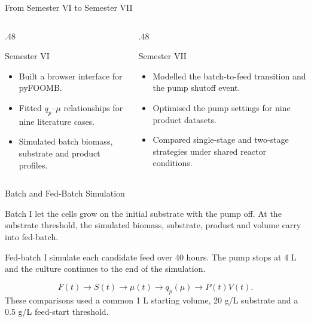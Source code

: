\documentclass[aspectratio=169, 11pt]{beamer}
\begin{document}
\begin{frame}{From Semester VI to Semester VII}
  \begin{columns}[T]
    \begin{column}{.48\textwidth}
      \begin{block}{Semester VI}
        \begin{itemize}
          \item Built a browser interface for pyFOOMB.
          \item Fitted $q_p$--$\mu$ relationships for nine literature cases.
          \item Simulated batch biomass, substrate and product profiles.
        \end{itemize}
      \end{block}
    \end{column}
    \begin{column}{.48\textwidth}
      \begin{block}{Semester VII}
        \begin{itemize}
          \item Modelled the batch-to-feed transition and the pump shutoff event.
          \item Optimised the pump settings for nine product datasets.
          \item Compared single-stage and two-stage strategies under shared reactor conditions.
        \end{itemize}
      \end{block}
    \end{column}
  \end{columns}
\end{frame}

\begin{frame}{Batch and Fed-Batch Simulation}
  \begin{block}{Batch}
    I let the cells grow on the initial substrate with the pump off. At the substrate threshold, the simulated biomass, substrate, product and volume carry into fed-batch.
  \end{block}
  \begin{block}{Fed-batch}
    I simulate each candidate feed over 40 hours. The pump stops at 4 L and the culture continues to the end of the simulation.
  \end{block}
  \[
      F(t)\longrightarrow S(t)\longrightarrow \mu(t)
      \longrightarrow q_p(\mu)\longrightarrow P(t)V(t).
  \]
  \small These comparisons used a common 1 L starting volume, 20 g/L substrate and a 0.5 g/L feed-start threshold.
\end{frame}
\end{document}
